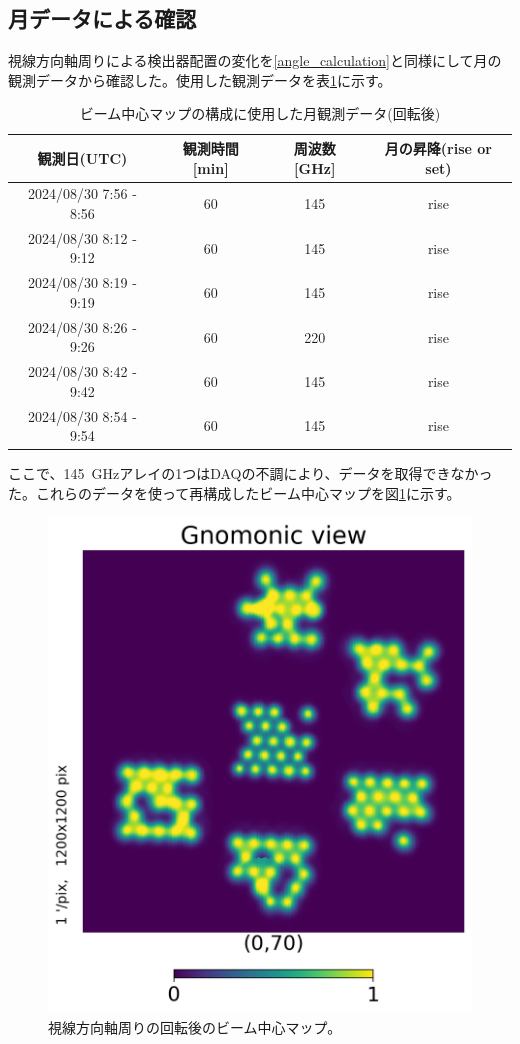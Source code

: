 \subsection{月データによる確認}
\label{moon_ana}
視線方向軸周りによる検出器配置の変化を\ref{angle_calculation}と同様にして月の観測データから確認した。使用した観測データを表\ref{after_full_array_table}に示す。
\begin{table}[htbp]
  \centering
  \caption{ビーム中心マップの構成に使用した月観測データ(回転後)}
  \vspace{3mm}
  \begin{tabular}{cccc} \hline
    観測日(UTC) & 観測時間 [min] & 周波数 [GHz] & 月の昇降(rise or set) \\ \hline
    2024/08/30 7:56 - 8:56 & 60 & 145 & rise \\
    2024/08/30 8:12 - 9:12 & 60 & 145 & rise \\
    2024/08/30 8:19 - 9:19 & 60 & 145 & rise \\
    2024/08/30 8:26 - 9:26 & 60 & 220 & rise \\
    2024/08/30 8:42 - 9:42 & 60 & 145 & rise \\
    2024/08/30 8:54 - 9:54 & 60 & 145 & rise \\ \hline

  \end{tabular}
  \label{after_full_array_table}
\end{table}
ここで、\SI{145}{GHz}アレイの1つはDAQの不調により、データを取得できなかった。これらのデータを使って再構成したビーム中心マップを図\ref{after_full_beam_map}に示す。

\begin{figure}[htbp]
  \centering
  \includegraphics[width=0.7\columnwidth]{5_alignment/figs/after_full_gnomonic_70.png}
  \caption{視線方向軸周りの回転後のビーム中心マップ。}
  \label{after_full_beam_map}
\end{figure}

